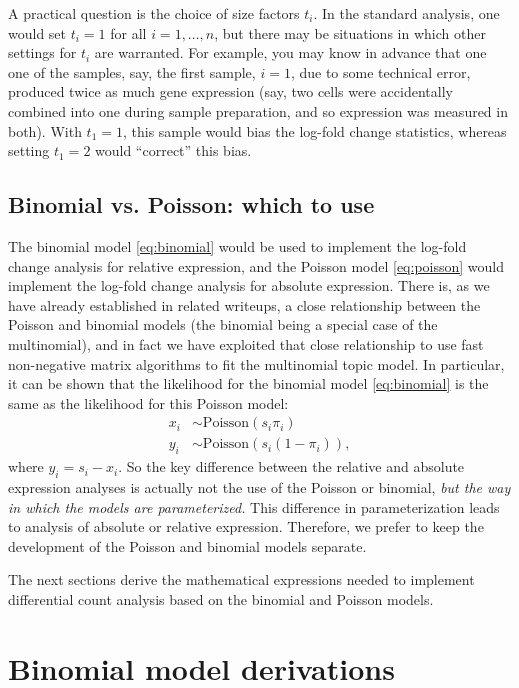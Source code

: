 \documentclass[final]{siamart171218}
\begin{document}
A practical question is the choice of size factors $t_i$. In the
standard analysis, one would set $t_i = 1$ for all $i = 1, \ldots, n$,
but there may be situations in which other settings for $t_i$ are
warranted. For example, you may know in advance that one one of the
samples, say, the first sample, $i = 1$, due to some technical error,
produced twice as much gene expression (say, two cells were
accidentally combined into one during sample preparation, and so
expression was measured in both). With $t_1 = 1$, this sample would
bias the log-fold change statistics, whereas setting $t_1 = 2$ would
``correct'' this bias.

\subsection{Binomial vs. Poisson: which to use}

The binomial model \eqref{eq:binomial} would be used to implement the
log-fold change analysis for relative expression, and the Poisson
model \eqref{eq:poisson} would implement the log-fold change analysis
for absolute expression. There is, as we have already established in
related writeups, a close relationship between the Poisson and
binomial models (the binomial being a special case of the
multinomial), and in fact we have exploited that close relationship to
use fast non-negative matrix algorithms to fit the multinomial topic
model. In particular, it can be shown that the likelihood for the
binomial model \eqref{eq:binomial} is the same as the likelihood for
this Poisson model:
\begin{align*}
x_i &\sim \mathrm{Poisson}(s_i \pi_i) \\
y_i &\sim \mathrm{Poisson}(s_i(1-\pi_i)),
\end{align*}
where $y_i = s_i - x_i$. So the key difference between the relative
and absolute expression analyses is actually not the use of the
Poisson or binomial, {\em but the way in which the models are
  parameterized.} This difference in parameterization leads to
analysis of absolute or relative expression. Therefore, we prefer to
keep the development of the Poisson and binomial models separate.

The next sections derive the mathematical expressions needed to
implement differential count analysis based on the binomial and
Poisson models.

\section{Binomial model derivations}
\end{document}
